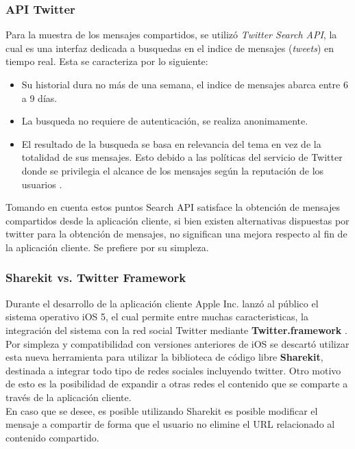 		\subsubsection{API Twitter}
		Para la muestra de los mensajes compartidos, se utilizó \textit{Twitter Search API}, la cual es una interfaz dedicada a busquedas en el indice de mensajes (\textit{tweets}) en tiempo real. Esta se caracteriza por lo siguiente:
		
		\begin{itemize}
		\item Su historial dura no más de una semana, el indice de mensajes abarca entre 6 a 9 días.
		\item La busqueda no requiere de autenticación, se realiza anonimamente.
		\item El resultado de la busqueda se basa en relevancia del tema en vez de la totalidad de sus mensajes. Esto debido a las políticas del servicio de Twitter donde se privilegia el alcance de los mensajes según la reputación de los usuarios \cite{twitter-relevance}.
		\end{itemize}

Tomando en cuenta estos puntos Search API satisface la obtención de mensajes compartidos desde la aplicación cliente, si bien existen alternativas dispuestas por twitter para la obtención de mensajes, no significan una mejora respecto al fin de la aplicación cliente. Se prefiere por su simpleza.
		
		\subsubsection{Sharekit vs. Twitter Framework}
Durante el desarrollo de la aplicación cliente Apple Inc. lanzó al público el sistema operativo iOS 5, el cual permite entre muchas caracteristicas, la integración del sistema con la red social Twitter mediante \textbf{Twitter.framework} . Por simpleza y compatibilidad con versiones anteriores de iOS se descartó utilizar esta nueva herramienta para utilizar la biblioteca de código libre \textbf{Sharekit}\cite{library-sharekit}, destinada a integrar todo tipo de redes sociales incluyendo twitter. Otro motivo de esto es la posibilidad de expandir a otras redes el contenido que se comparte a través de la aplicación cliente. \\

En caso que se desee, es posible utilizando Sharekit es posible modificar el mensaje a compartir de forma que el usuario no elimine el URL relacionado al contenido compartido.

